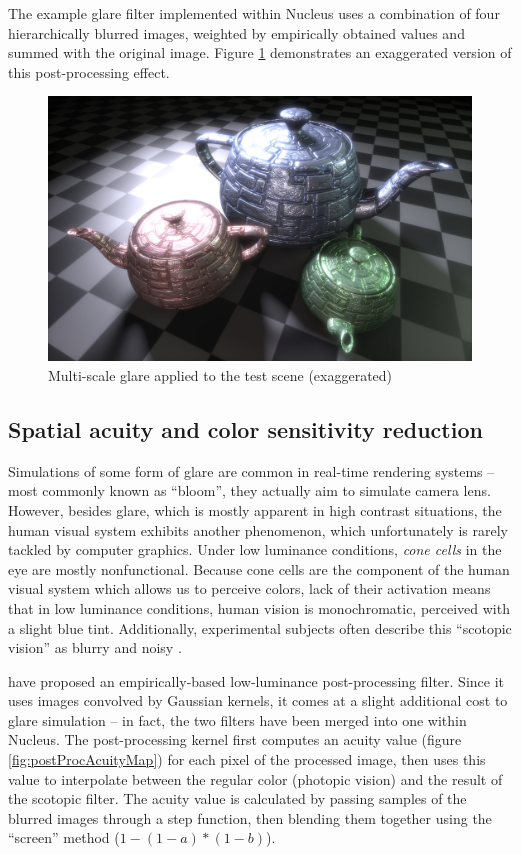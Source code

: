 The example glare filter implemented within Nucleus uses a combination of four hierarchically blurred images, weighted by empirically obtained values and summed with the original image. Figure \ref{fig:postProcGlare} demonstrates an exaggerated version of this post-processing effect.

\begin{figure}[h!]
  \centering
    \includegraphics[width=0.9\linewidth]{./Figures/postProc/glare.jpg}
    \caption[Glare]{Multi-scale glare applied to the test scene (exaggerated)}
  \label{fig:postProcGlare}
\end{figure}

\subsection{Spatial acuity and color sensitivity reduction}

Simulations of some form of glare are common in real-time rendering systems -- most commonly known as ``bloom'', they actually aim to simulate camera lens. However, besides glare, which is mostly apparent in high contrast situations, the human visual system exhibits another phenomenon, which unfortunately is rarely tackled by computer graphics. Under low luminance conditions, \emph{cone cells} in the eye are mostly nonfunctional. Because cone cells are the component of the human visual system which allows us to perceive colors, lack of their activation means that in low luminance conditions, human vision is monochromatic, perceived with a slight blue tint. Additionally, experimental subjects often describe this ``scotopic vision'' as blurry and noisy \cite{Thompson_aspatial}.

\citet{Thompson_aspatial} have proposed an empirically-based low-luminance post-processing filter. Since it uses images convolved by Gaussian kernels, it comes at a slight additional cost to glare simulation -- in fact, the two filters have been merged into one within Nucleus. The post-processing kernel first computes an acuity value (figure \ref{fig:postProcAcuityMap}) for each pixel of the processed image, then uses this value to interpolate between the regular color (photopic vision) and the result of the scotopic filter. The acuity value is calculated by passing samples of the blurred images through a step function, then blending them together using the ``screen'' method ($1 - (1-a)*(1-b)$).

